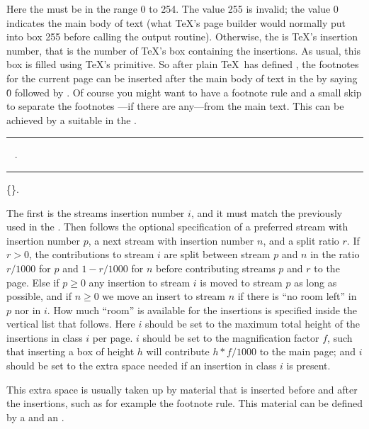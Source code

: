 Here  the  must be in the range 0 to 254. The value 255 is invalid;
the value 0 indicates the main body of text (what \TeX's page builder would normally put into
box 255 before calling the output routine).
Otherwise, the  is \TeX's insertion number, that is the number of \TeX's box 
containing the insertions. As usual, this box is filled using \TeX's  primitive. 
So after plain \TeX\ has defined ,
the footnotes for the current page can be inserted after the main body of text in the 
by saying \.0 followed by .
Of course you might want to have a footnote rule and a small skip to separate the 
footnotes ---if there are any---from the main text. This can be achieved by a suitable
 in the .

\medskip
{}
\rule{}:
  \OR\  .
\rule{}:
     \opt{\.{=}}
 \.{\{}\.{\}}.
\medskip


The first  is the streams insertion number $i$,
and it must match the  
previously used in the .
Then follows the optional specification of a preferred stream with insertion number $p$,
a next stream with insertion number $n$, and a split ratio $r$.
If $r>0$, the contributions to stream $i$ are split between
stream $p$ and $n$  in the ratio $r/1000$ for $p$ and $1-r/1000$ for $n$
before contributing streams $p$ and $r$ to the page.
Else if $p\ge0$ any insertion to stream $i$ is moved to stream $p$ as long as possible,
and if $n\ge0$ we move an insert to stream $n$ if there is ``no room left'' in $p$ nor in $i$.
How much ``room'' is available for the insertions is specified inside the vertical list
that follows.
Here $i$ should be set to the maximum total height of the insertions in class $i$ per page. 
$i$ should be set to the magnification factor $f$,
such that inserting a box of height $h$ will contribute $h*f/1000$ to the main page;
and $i$ should be set to the extra space needed if an insertion in class $i$ is present.

This extra space is usually taken up by material that is inserted before and after the insertions,
such as for example the footnote rule. This material can be defined by a 
 and an .

